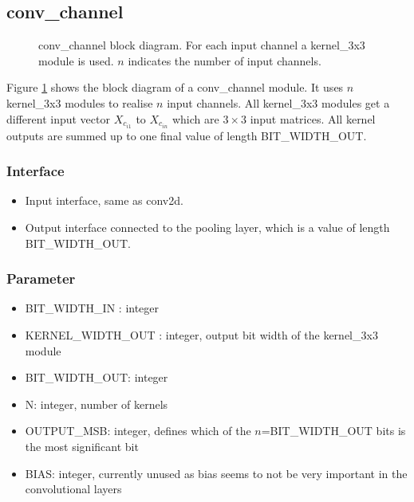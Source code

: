\subsection{conv\_channel}

\begin{figure}[h]
	\centering
	
	\caption[conv\_channel block diagram.]{conv\_channel block diagram. For each input channel a kernel\_3x3 module is used. $n$ indicates the number of input channels.}
	\label{FIG:conv-channel}
\end{figure}
Figure \ref{FIG:conv-channel} shows the block diagram of a conv\_channel module. It uses $n$ kernel\_3x3 modules to realise $n$ input channels. 
All kernel\_3x3 modules get a different input vector $X_{c_{i1}}$ to $X_{c_{in}}$ which are $3 \times 3$ input matrices. All kernel outputs are summed up
to one final value of length BIT\_WIDTH\_OUT.
\subsubsection{Interface}
\begin{itemize}
	\item Input interface, same as conv2d.
	\item Output interface connected to the pooling layer, which is a value of length BIT\_WIDTH\_OUT.
\end{itemize}
\subsubsection{Parameter}
\begin{itemize}
 	\item BIT\_WIDTH\_IN : integer
 	\item KERNEL\_WIDTH\_OUT : integer, output bit width of the kernel\_3x3 module
 	\item BIT\_WIDTH\_OUT: integer
 	\item N: integer, number of kernels
 	\item OUTPUT\_MSB: integer, defines which of the $n$=BIT\_WIDTH\_OUT bits is the most significant bit
 	\item BIAS: integer, currently unused as bias seems to not be very important in the convolutional layers
\end{itemize}